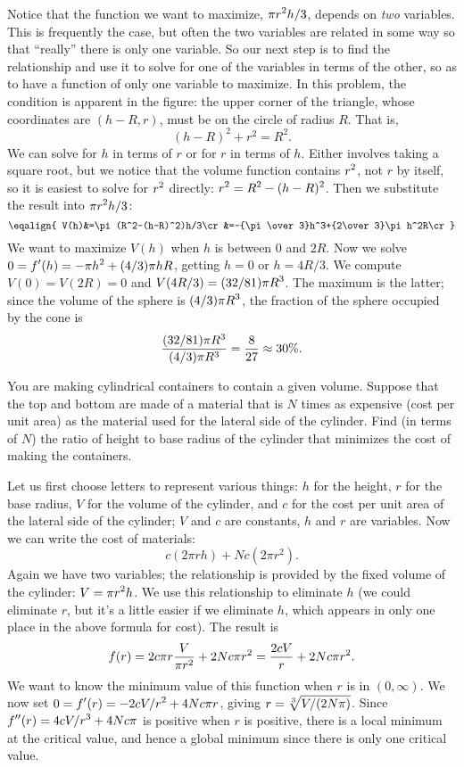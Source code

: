 Notice that the function we want to maximize, $\displaystyle \pi r^2h/3$,
depends on {\em two\/} variables.  This is frequently the case, but
often the two variables are related in some way so that ``really''
there is only one variable. So our next step is to
find the relationship and use it to solve for one of the variables in
terms of the other, so as to have a function of only one variable to
maximize.  In this problem, the condition is apparent in the figure:
the upper corner of the triangle, whose coordinates are $(h-R,r)$,
must be on the circle of radius $R$.  That is,
$$
      (h-R)^2+r^2=R^2.
$$ 
We can solve for $h$ in terms of $r$ or for $r$ in terms of $h$.
Either involves taking a square root, but we notice that the volume
function contains $\displaystyle r^2$, not $r$ by itself, so it is easiest to solve
for $\displaystyle r^2$ directly: $\displaystyle r^2=R^2-(h-R)^2$.
Then we substitute the result into $\displaystyle \pi r^2h/3$:
$$
\eqalign{ V(h)&=\pi(R^2-(h-R)^2)h/3\cr
&=-{\pi\over3}h^3+{2\over3}\pi h^2R\cr 
}$$ 
We want to maximize $V(h)$ when $h$ is between 0 and $2R$.  Now we
solve $\displaystyle 0=f'(h)=-\pi h^2+(4/3)\pi h R$, getting $h=0$ or $h=4R/3$. 
We compute $V(0)=V(2R)=0$ and $\displaystyle V(4R/3)=(32/81)\pi R^3$. The maximum is
the latter; since the volume of the sphere is $\displaystyle (4/3)\pi R^3$, the
fraction of the sphere occupied by the cone is 
$${(32/81)\pi R^3\over (4/3)\pi R^3}={8\over 27}\approx 30\%.$$
\endexample

\example
You are making cylindrical containers to contain a given volume.  Suppose
that the top and bottom are made of a material that is $N$ times as
expensive (cost per unit area) as the material used for the lateral side of
the cylinder.  Find (in terms of $N$) the ratio of height to base radius of
the cylinder that minimizes the cost of making the containers.

Let us first choose letters to represent various things: $h$ for the
height, $r$ for the base radius, $V$ for the volume of the
cylinder, and $c$ for the cost per unit area of the lateral side of
the cylinder; $V$ and $c$ are constants, $h$ and $r$ are variables.
Now we can write the cost of materials:
$$
  c(2\pi rh)+Nc(2\pi r^2).
$$
Again we have two variables; the relationship is provided by the fixed
volume of the cylinder: $\displaystyle V=\pi r^2h$. We use this
relationship to eliminate $h$ (we could eliminate $r$, but it's a little easier
if we eliminate $h$, which appears in only one place in the above formula
for cost).  The result is
$$
   f(r)=2c\pi r{V\over\pi r^2}+2Nc\pi r^2={2cV\over r}+2Nc\pi r^2.
$$
We want to know the minimum value of this function when $r$ is in
$(0,\infty)$. 
We now set $\displaystyle 0=f'(r)=-2cV/r^2+4Nc\pi
r$, giving $\ds r={\root 3 \of {V/(2N\pi)}}$.  
Since $\displaystyle f''(r)=4cV/r^3+4Nc\pi$ is positive when $r$ is positive, there
is a local minimum at the critical value, and hence a global minimum
since there is only one critical value.

